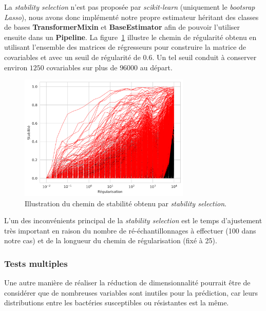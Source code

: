 \documentclass[11pt]{article}
\begin{document}
  La \textit{stability selection} n'est pas proposée par \textit{scikit-learn} (uniquement le \textit{bootsrap Lasso}), nous avons donc implémenté notre propre estimateur héritant des classes de bases \textbf{TransformerMixin} et \textbf{BaseEstimator} afin de pouvoir l'utiliser ensuite dans un \textbf{Pipeline}.
  La figure~\ref{fig:stab_path} illustre le chemin de régularité obtenu en utilisant l'ensemble des matrices de régresseurs pour construire la matrice de covariables et avec un seuil de régularité de $0.6$.
  Un tel seuil conduit à conserver environ $1250$ covariables sur plus de $96000$ au départ.

  \begin{figure}[H]
    \centering
    \includegraphics[height=6cm,width=\textwidth,keepaspectratio]{stab_sel}
    \caption{Illustration du chemin de stabilité obtenu par \textit{stability selection}.}
    \label{fig:stab_path}
  \end{figure}

  L'un des inconvénients principal de la \textit{stability selection} est le temps d'ajustement très important en raison du nombre de ré-échantillonnages à effectuer (100 dans notre cas) et de la longueur du chemin de régularisation (fixé à 25).

\hypertarget{tests-multiples}{%
\subsubsection{Tests multiples}\label{tests-multiples}}

  Une autre manière de réaliser la réduction de dimensionnalité pourrait être de considérer que de nombreuses variables sont inutiles pour la prédiction, car leurs distributions entre les bactéries susceptibles ou résistantes est la même.
\end{document}
